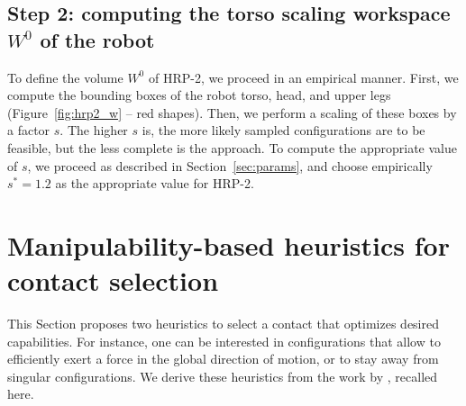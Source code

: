 \documentclass[journal]{IEEEtran}
\providecommand{\DIFaddtex}[1]{#1} %
\providecommand{\DIFdeltex}[1]{} %
\providecommand{\DIFaddbegin}{\protect\color{blue}} %
\providecommand{\DIFaddend}{\protect\color{black}} %
\providecommand{\DIFdelbegin}{\protect\cbdelete} %
\providecommand{\DIFdelend}{} %
\providecommand{\DIFadd}[1]{\texorpdfstring{\DIFaddtex{#1}}{#1}} %
\providecommand{\DIFdel}[1]{\texorpdfstring{\DIFdeltex{#1}}{}} %
\begin{document}
\subsection{Step 2: computing the torso scaling workspace $W^0$ of the robot}
To define the volume $W^0$ of HRP-2, we proceed in an empirical manner.
First, we compute the bounding boxes of the robot torso, head, and upper legs (Figure~\ref{fig:hrp2_w} -- red shapes).
Then, we perform a scaling of these boxes by a factor $s$. 
The higher $s$ is, the more likely sampled configurations are to be feasible, but the less complete is the approach.
To compute the appropriate value of $s$, we proceed as described in Section~\ref{sec:params}, and choose empirically
$s^*=1.2$ as the appropriate value for HRP-2.
\DIFaddbegin \section{\DIFadd{Manipulability-based heuristics for contact selection}}
\label{sec:heuristics}
\DIFaddend This Section proposes \DIFaddbegin \DIFadd{two }\DIFaddend heuristics to select a contact that optimizes desired capabilities.
For instance, one can be interested in configurations that allow to efficiently exert a force in the global direction of motion, \DIFdelbegin \DIFdel{a high velocity in a given direction, }\DIFdelend or to stay away from singular configurations.
We derive \DIFdelbegin \DIFdel{three such }\DIFdelend \DIFaddbegin \DIFadd{these }\DIFaddend heuristics from the work by \cite{Yoshikawa1984}, recalled here. %
\end{document}
